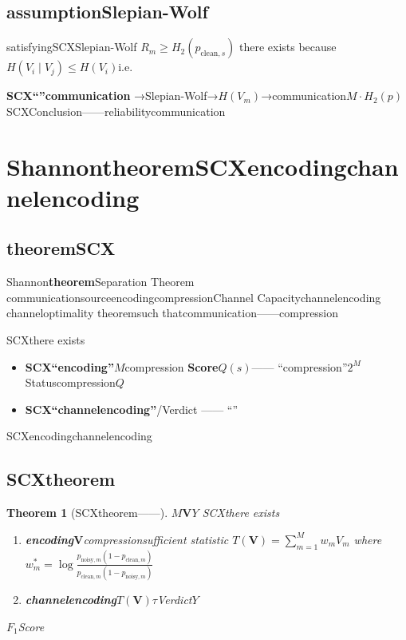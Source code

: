 \documentclass[11pt,a4paper]{article}
\newtheorem{theorem}{Theorem}[section]
\theoremstyle{remark}
\begin{document}
\subsection{assumptionSlepian-Wolf}

satisfyingSCXSlepian-Wolf
$R_m \geq H_2(p_{\text{clean},s})$
there exists\textbf{}
because$H(V_i \mid V_j) \leq H(V_i)$i.e.\textbf{}

\textbf{SCX``''communication}
→Slepian-Wolf→$H(V_m)$→communication$M \cdot H_2(p)$
SCXConclusion——reliabilitycommunication

\section{ShannontheoremSCXencodingchannelencoding}

\subsection{theoremSCX}

Shannon\textbf{theorem}Separation Theorem\cite{shannon1948}
communicationsourceencodingcompressionChannel Capacitychannelencoding
channel\textbf{}optimality
theoremsuch thatcommunication——compression

SCXthere exists
\begin{itemize}
    \item \textbf{SCX``encoding''}$M$compression
          \textbf{Score}$Q(s)$——
          ``compression''$2^M$Statuscompression$Q$
    \item \textbf{SCX``channelencoding''}/Verdict
          ——
          ``''
\end{itemize}

SCXencodingchannelencoding

\subsection{SCXtheorem}

\begin{theorem}[SCXtheorem——]
\label{thm:scx_separation}
$M$$\mathbf{V}$$Y$\textbf{}
SCXthere exists
\begin{enumerate}[label=(\roman*)]
    \item \textbf{encoding}$\mathbf{V}$compressionsufficient statistic
          $T(\mathbf{V}) = \sum_{m=1}^{M} w_m V_m$
          where$w_m^* = \log\frac{p_{\text{noisy}, m}(1-p_{\text{clean}, m})}{p_{\text{clean}, m}(1-p_{\text{noisy}, m})}$
    \item \textbf{channelencoding}$T(\mathbf{V})$$\tau$Verdict$Y$
\end{enumerate}
$F_1$Score
\end{theorem}
\end{document}

